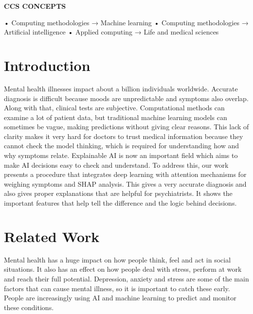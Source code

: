 \documentclass[conference]{IEEEtran}
\begin{document}
\textbf{CCS CONCEPTS}

• Computing methodologies → Machine learning • Computing methodologies → Artificial intelligence • Applied computing → Life and medical sciences

\section{Introduction}

Mental health illnesses impact about a billion individuals worldwide. Accurate diagnosis is difficult because moods are unpredictable and symptoms also overlap. Along with that, clinical tests are subjective. Computational methods can examine a lot of patient data, but traditional machine learning models can sometimes be vague, making predictions without giving clear reasons. This lack of clarity makes it very hard for doctors to trust medical information because they cannot check the model thinking, which is required for understanding how and why symptoms relate. Explainable AI is now an important field which aims to make AI decisions easy to check and understand. To address this, our work presents a procedure that integrates deep learning with attention mechanisms for weighing symptoms and SHAP analysis. This gives a very accurate diagnosis and also gives proper explanations that are helpful for psychiatrists. It shows the important features that help tell the difference and the logic behind decisions.

\section{Related Work}

Mental health has a huge impact on how people think, feel and act in social situations. It also has an effect on how people deal with stress, perform at work and reach their full potential. Depression, anxiety and stress are some of the main factors that can cause mental illness, so it is important to catch these early. People are increasingly using AI and machine learning to predict and monitor these conditions.
\end{document}
